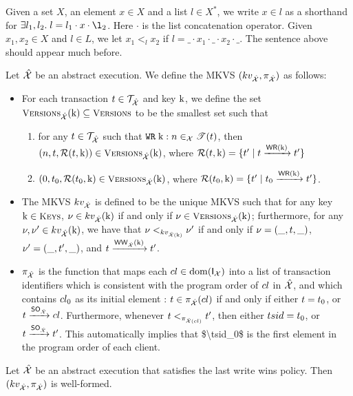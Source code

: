 Given a set $X$, an element $x \in X$ and a list $l \in X^{\ast}$, we write 
$x \in l$ as a shorthand for $\exists l_1, l_2. \; l = l_1 \cdot x \cdot \l_2$. 
Here $\cdot$ is the list concatenation operator. Given $x_1, x_2 \in X$ and 
$l \in L$, we let $x_1 <_{l} x_2$ if $l = \_ \cdot x_1 \cdot \_ \cdot x_2 \cdot \_$.
\ac{The sentence above should appear much before.}

\begin{definition}
Let $\hat{\mathcal{X}}$ be an abstract execution. 
We define the MKVS $(kv_{\hat{\mathcal{X}}}, \pi_{\hat{\mathcal{X}}})$ as follows: 
\begin{itemize}
\item For each transaction $t \in \mathcal{T}_{\hat{\mathcal{X}}}$ and key $\mathrm{k}$, 
we define the set $\Versions_{\hat{\aexec}}(\key{k}) \subseteq \Versions$ to be the smallest set such that 
\begin{enumerate}
\item for any $t \in \mathcal{T}_{\hat{\mathcal{X}}}$ such that ${{\tt WR}}\;\mathrm{k}: n \in_{\mathcal{X}} \mathscr{T}(t)$,
then
$(n, \tsid, \mathcal{R}(\tsid, \key{k})) \in \Versions_{\hat{\aexec}}(\key{k})$, 
where $\mathcal{R}(t, \mathrm{k}) = \{t' \mid t \xrightarrow{{\mathsf{WR}}(\mathrm{k})} t'\}$ 
\item $(0, \tsid_0, \mathcal{R}(\tsid_{0}, \key{k}) \in \Versions_{\hat{\aexec}}(\key{k})$, 
where $\mathcal{R}(t_{0}, \mathrm{k}) = \{t' \mid t_0 \xrightarrow{{\mathsf{WR}}(\mathrm{k})} t'\}$.
\end{enumerate}
\item The MKVS $kv_{\hat{\mathcal{X}}}$ is defined to be the unique MKVS such that 
for any key $\key{k} \in \Addr$, $\nu \in kv_{\hat{\mathcal{X}}}(\mathrm{k})$ if and only if 
$\nu \in \Versions_{\hat{\aexec}}(\key{k})$; furthermore, for any $\nu, \nu' \in kv_{\hat{\mathcal{X}}}(\mathrm{k})$, 
we have that $\nu <_{kv_{\hat{\mathcal{X}}(\mathrm{k})}} \nu'$ if and only if $\nu = (\_, t, \_)$, 
$\nu' = (\_, t', \_)$, and $t \xrightarrow{{\mathsf{WW}}_{\hat{\mathcal{X}}}(\mathrm{k})} t'$.
\item $\pi_{\hat{\mathcal{X}}}$ is the function that maps each $cl \in \operatorname{dom}(\mathsf{I}_{\mathcal{X}})$ into a list of transaction 
identifiers which is consistent with the program order of $cl$ in $\hat{\mathcal{X}}$, and which 
contains $cl_0$ as its initial element : $t \in \pi_{\hat{\mathcal{X}}}(cl)$ 
if and only if either $t = t_0$, or $t \xrightarrow{{\sf{SO}}_{\hat{\mathcal{X}}}} cl$. 
Furthermore, whenever $t <_{\pi_{\hat{\mathcal{X}}(cl)}} t'$, then either 
$tsid = t_0$, or $t \xrightarrow{{\sf{SO}}_{\hat{\mathcal{X}}}} t'$. 
\ac{This automatically implies that $\tsid_0$ is the first element in the program order 
of each client.}
\end{itemize}
\end{definition}

\begin{proposition}
Let $\hat{\mathcal{X}}$ be an abstract execution that satisfies the last write wins policy. 
Then $(kv_{\hat{\mathcal{X}}}, \pi_{\hat{\mathcal{X}}})$ is well-formed.
\end{proposition}


